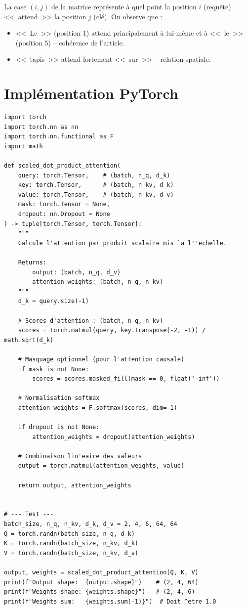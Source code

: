 \begin{remarque}
La case $(i, j)$ de la matrice repr\'esente \`a quel point la position $i$
(requ\^ete) <<~attend~>> la position $j$ (cl\'e). On observe que :
\begin{itemize}
  \item <<~Le~>> (position 1) attend principalement \`a lui-m\^eme et \`a
    <<~le~>> (position 5) -- coh\'erence de l'article.
  \item <<~tapis~>> attend fortement <<~sur~>> -- relation spatiale.
\end{itemize}
\end{remarque}

\section{Impl\'ementation PyTorch}
\label{sec:attention-pytorch}

\begin{codeblock}[title=\textbf{Scaled Dot-Product Attention \`a partir de z\'ero}]
\begin{verbatim}
import torch
import torch.nn as nn
import torch.nn.functional as F
import math

def scaled_dot_product_attention(
    query: torch.Tensor,    # (batch, n_q, d_k)
    key: torch.Tensor,      # (batch, n_kv, d_k)
    value: torch.Tensor,    # (batch, n_kv, d_v)
    mask: torch.Tensor = None,
    dropout: nn.Dropout = None
) -> tuple[torch.Tensor, torch.Tensor]:
    """
    Calcule l'attention par produit scalaire mis `a l''echelle.

    Returns:
        output: (batch, n_q, d_v)
        attention_weights: (batch, n_q, n_kv)
    """
    d_k = query.size(-1)

    # Scores d'attention : (batch, n_q, n_kv)
    scores = torch.matmul(query, key.transpose(-2, -1)) / math.sqrt(d_k)

    # Masquage optionnel (pour l'attention causale)
    if mask is not None:
        scores = scores.masked_fill(mask == 0, float('-inf'))

    # Normalisation softmax
    attention_weights = F.softmax(scores, dim=-1)

    if dropout is not None:
        attention_weights = dropout(attention_weights)

    # Combinaison lin'eaire des valeurs
    output = torch.matmul(attention_weights, value)

    return output, attention_weights


# --- Test ---
batch_size, n_q, n_kv, d_k, d_v = 2, 4, 6, 64, 64
Q = torch.randn(batch_size, n_q, d_k)
K = torch.randn(batch_size, n_kv, d_k)
V = torch.randn(batch_size, n_kv, d_v)

output, weights = scaled_dot_product_attention(Q, K, V)
print(f"Output shape:  {output.shape}")    # (2, 4, 64)
print(f"Weights shape: {weights.shape}")   # (2, 4, 6)
print(f"Weights sum:   {weights.sum(-1)}")  # Doit ^etre 1.0
\end{verbatim}
\end{codeblock}

